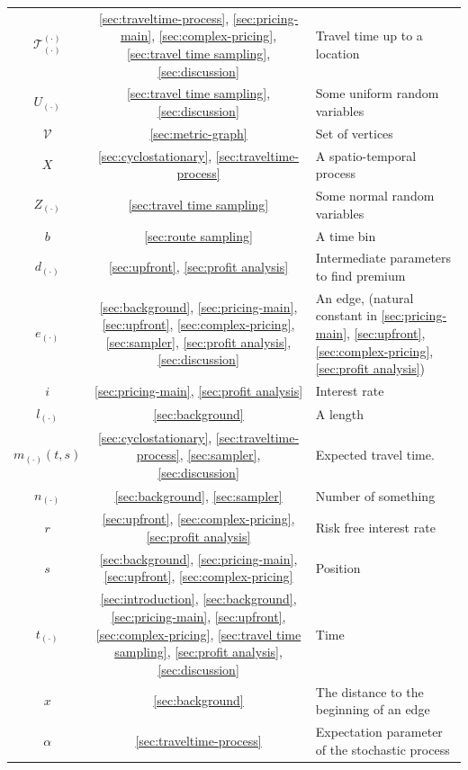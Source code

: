 \documentclass[12pt]{article}
\begin{document}
{{{{{{\begin{appendices}
\begin{longtable}{|c|c|l|}
\(\mathcal{T}^{(\cdot)}_{(\cdot)}\) & \ref{sec:traveltime-process}, \ref{sec:pricing-main}, \ref{sec:complex-pricing}, \ref{sec:travel time sampling}, \ref{sec:discussion}& Travel time up to a location\\
\(U_{(\cdot)}\) & \ref{sec:travel time sampling}, \ref{sec:discussion} & Some uniform random variables \\
\(\mathcal{V}\) & \ref{sec:metric-graph} & Set of vertices\\
\(X\) & \ref{sec:cyclostationary}, \ref{sec:traveltime-process}& A spatio-temporal process \\
\(Z_{(\cdot)}\) & \ref{sec:travel time sampling} & Some normal random variables \\
\(b\) & \ref{sec:route sampling} & A time bin\\
\(d_{(\cdot)}\) & \ref{sec:upfront}, \ref{sec:profit analysis} & Intermediate parameters to find premium\\
\(e_{(\cdot)}\)& \ref{sec:background}, \ref{sec:pricing-main}, \ref{sec:upfront}, \ref{sec:complex-pricing}, \ref{sec:sampler}, \ref{sec:profit analysis}, \ref{sec:discussion}
& An edge, (natural constant in \ref{sec:pricing-main}, \ref{sec:upfront}, \ref{sec:complex-pricing}, \ref{sec:profit analysis}) \\
\(i\) & \ref{sec:pricing-main}, \ref{sec:profit analysis} & Interest rate \\
\(l_{(\cdot)}\) & \ref{sec:background} & A length \\
\(m_{(\cdot)}(t,s)\) & \ref{sec:cyclostationary}, \ref{sec:traveltime-process}, \ref{sec:sampler}, \ref{sec:discussion}& Expected travel time.\\
\(n_{(\cdot)}\) & \ref{sec:background}, \ref{sec:sampler} & Number of something \\
\(r\) & \ref{sec:upfront}, \ref{sec:complex-pricing}, \ref{sec:profit analysis} & Risk free interest rate \\
\(s\) & \ref{sec:background}, \ref{sec:pricing-main}, \ref{sec:upfront}, \ref{sec:complex-pricing} & Position \\
\(t_{(\cdot)}\) & \ref{sec:introduction}, \ref{sec:background}, \ref{sec:pricing-main}, \ref{sec:upfront}, \ref{sec:complex-pricing}, \ref{sec:travel time sampling}, \ref{sec:profit analysis}, \ref{sec:discussion} & Time \\
\(x\) & \ref{sec:background} & The distance to the beginning of an edge\\
\(\alpha\) & \ref{sec:traveltime-process} & Expectation parameter of the stochastic process \\

\end{longtable}
\end{appendices}}}}}}}
\end{document}
